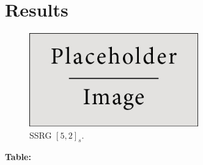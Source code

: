 \documentclass{article}
\begin{document}
 

\section{Results}

\begin{figure}[h]
  \begin{center}
    \includegraphics[width=0.65\textwidth]{img/placeholder.jpg}
    \caption{SSRG $[5,2]_s$.}
  \end{center}
\end{figure}

\textbf{Table:}
\end{document}
